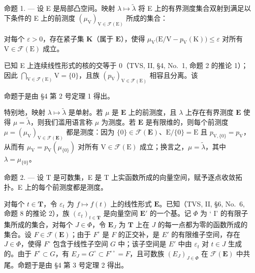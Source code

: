 命题 1. --- 设 E 是局部凸空间。映射 \(\lambda \mapsto \widetilde{\lambda}\) 将 E 上的有界测度集合双射到满足以下条件的 E 上的前测度 \((\mu_{\mathrm{V}})_{\mathrm{V} \in \mathcal{F}(\mathrm{E})}\) 所成的集合：

对每个 \(\varepsilon > 0\)，存在紧子集 \(\mathbf{K}\)（属于 \(\mathbf{E}\)），使得 \(\mu_{\mathrm{V}}\big(\mathrm{E} / \mathrm{V} - p_{\mathrm{V}}(\mathrm{K})\big) \leqslant \varepsilon\) 对所有 \(\mathrm{V} \in \mathcal{F}(\mathrm{E})\) 成立。

已知 E 上连续线性形式的核的交等于 0（TVS, II, §4, No.~1, 命题 2 的推论 1）；因此 \(\bigcap_{\mathrm{V} \in \mathcal{F}(\mathrm{E})} \mathrm{V} = \{0\}\)，且族 \((p_{\mathrm{V}})_{\mathrm{V} \in \mathcal{F}(\mathrm{E})}\) 相容且分离。该

命题于是由 §4 第 2 号定理 1 得出。

特别地，映射 \(\lambda \mapsto \widetilde{\lambda}\) 是单射。若 \(\mu\) 是 \(\mathbf{E}\) 上的前测度，且 \(\lambda\) 上存在有界测度 \(\mathbf{E}\) 使得 \(\mu = \widetilde{\lambda}\)，则我们滥用语言称 \(\mu\) 为测度。若 \(\mathbf{E}\) 是有限维的，则每个前测度 \(\mu = (\mu_{\mathrm{V}})_{\mathrm{V} \in \mathcal{F}(\mathbf{E})}\) 都是测度：因为 \(\{0\} \in \mathcal{F}(\mathbf{E})\)、\(\mathrm{E}/\{0\} = \mathrm{E}\) 且 \(p_{\mathrm{V},\{0\}} = p_{\mathrm{V}}\)，从而有 \(\mu_{\mathrm{V}} = p_{\mathrm{V}}(\mu_{\{0\}})\) 对所有 \(\mathrm{V} \in \mathcal{F}(\mathrm{E})\) 成立；换言之，\(\mu = \widetilde{\lambda}\)，其中 \(\lambda = \mu_{\{0\}}\)。

命题 2. --- 设 T 是可数集，E 是 T 上实函数所成的向量空间，赋予逐点收敛拓扑。E 上的每个前测度都是测度。

对每个 \(t \in \mathbf{T}\)，令 \(\varepsilon_t\) 为 \(f \mapsto f(t)\) 上的线性形式 \(\mathbf{E}\)。已知（TVS, II, §6, No.~6, 命题 8 的推论 2），族 \((\varepsilon_t)_{t \in \mathbf{T}}\) 是向量空间 \(\mathbf{E}'\) 的一个基。记 \(\Phi\) 为 ` I' 的有限子集所成的集合，对每个 \(J \in \Phi\)，令 \(\mathbf{E}_J\) 为 \(\mathbf{T}\) 上在 \(J\) 的每一点都为零的函数所成的集合。设 \(F \in \mathcal{F}(\mathbf{E})\)；由于 \(F^\circ\) 是 \(F\) 的正交补，是 \(E'\) 的有限维子空间，存在 \(J \in \Phi\)，使得 \(F^\circ\) 包含于线性子空间 \(G\) 中；该子空间是 \(E'\) 中由 \(\varepsilon_t\) 对 \(t \in J\) 生成的。由于 \(F^\circ \subset G\)，有 \(E_J = G^\circ \subset F^{\circ\circ} = F\)，且可数族 \((E_J)_{J \in \Phi}\) 在 \(\mathcal{F}(\mathbf{E})\) 中共尾。命题于是由 §4 第 3 号定理 2 得出。

